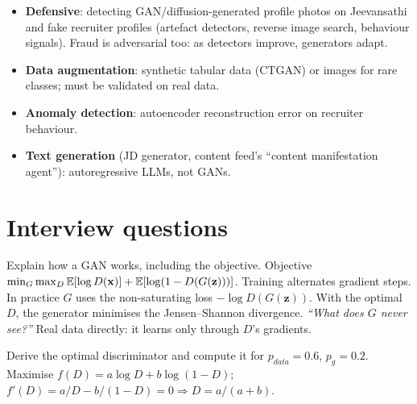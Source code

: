 \begin{practical}
\begin{itemize}
\item \textbf{Defensive}: detecting GAN/diffusion-generated profile photos on Jeevansathi and fake recruiter profiles (artefact detectors, reverse image search, behaviour
  signals). Fraud is adversarial too: as detectors improve, generators adapt.
\item \textbf{Data augmentation}: synthetic tabular data (CTGAN) or images for rare classes; must be validated on real data.
\item \textbf{Anomaly detection}: autoencoder reconstruction error on recruiter behaviour.
\item \textbf{Text generation} (JD generator, content feed's ``content manifestation agent''): autoregressive LLMs, not GANs.
\end{itemize}
\end{practical}

\section{Interview questions}

\begin{qa}{Explain how a GAN works, including the objective.}
\why Objective $\min_G\max_D\mathbb{E}[\log D(\mathbf x)] + \mathbb{E}[\log(1 - D(G(\mathbf z)))]$. Training alternates gradient steps. In practice $G$ uses the non-saturating loss
$-\log D(G(\mathbf z))$. With the optimal $D$, the generator minimises the Jensen--Shannon divergence.
\pushes \emph{``What does $G$ never see?''} Real data directly: it learns only through $D$'s gradients.
\end{qa}

\begin{qa}{Derive the optimal discriminator and compute it for $p_{data} = 0.6$, $p_g = 0.2$.}
\why Maximise $f(D) = a\log D + b\log(1 - D)$; $f'(D) = a/D - b/(1 - D) = 0\Rightarrow D = a/(a + b)$.
\end{qa}

